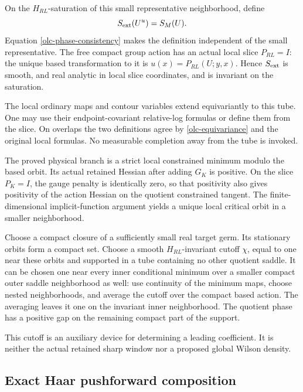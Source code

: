 On the $H_{RL}$-saturation of this small representative
neighborhood, define
\begin{equation}
                       S_{\rm ext}(U^u)=S_M(U).
 \label{olc-extended-phase}
\end{equation}
Equation \eqref{olc-phase-consistency} makes the definition
independent of the small representative. The free compact
group action has an actual local slice $P_{RL}=I$: the unique
based transformation to it is $u(x)=P_{RL}(U;y,x)$.
Hence $S_{\rm ext}$ is smooth, and real analytic in local
slice coordinates, and is invariant on the saturation.

The local ordinary maps and contour variables extend
equivariantly to this tube. One may use their endpoint-covariant
relative-log formulas or define them from the slice. On
overlaps the two definitions agree by
\eqref{olc-equivariance} and the original local formulas.
No measurable completion away from the tube is invoked.

The proved physical branch is a strict local constrained
minimum modulo the based orbit. Its actual retained
Hessian after adding $G_K$ is positive. On the slice $P_K=I$,
the gauge penalty is identically zero, so that positivity
also gives positivity of the action Hessian on the quotient
constrained tangent. The finite-dimensional implicit-function
argument yields a unique local critical orbit in a smaller
neighborhood.

Choose a compact closure of a sufficiently small real target
germ. Its stationary orbits form a compact set. Choose a smooth
$H_{RL}$-invariant cutoff $\chi$, equal to one near these orbits
and supported in a tube containing no other quotient saddle.
It can be chosen one near every inner conditional minimum
over a smaller compact outer saddle neighborhood as well:
use continuity of the minimum maps, choose nested neighborhoods,
and average the cutoff over the compact based action.
The averaging leaves it one on the invariant inner neighborhood.
The quotient phase has a positive gap on the remaining compact
part of the support.

This cutoff is an auxiliary device for determining a leading
coefficient. It is neither the actual retained sharp window
nor a proposed global Wilson density.

\subsection{Exact Haar pushforward composition}
\label{olc-pushforward-section}

